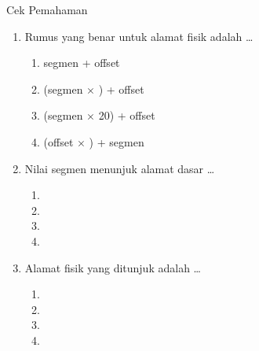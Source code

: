 \documentclass[aspectratio=169,11pt]{beamer}
\begin{document}
\begin{frame}{Cek Pemahaman}
\footnotesize
\begin{enumerate}
    \item Rumus yang benar untuk alamat fisik adalah \dots
          \begin{enumerate}
              \item segmen + offset
              \item (segmen $\times$ ) + offset
              \item (segmen $\times$ 20) + offset
              \item (offset $\times$ ) + segmen
          \end{enumerate}

    \vspace{0.2em}
    \item Nilai segmen  menunjuk alamat dasar \dots
          \begin{enumerate}
              \item {} \quad \item {} \quad
              \item {} \quad \item {}
          \end{enumerate}

    \vspace{0.2em}
    \item Alamat fisik yang ditunjuk  adalah
          \dots
          \begin{enumerate}
              \item {} \quad \item {} \quad
              \item {} \quad \item {}
          \end{enumerate}
\end{enumerate}
\end{frame}
\end{document}
